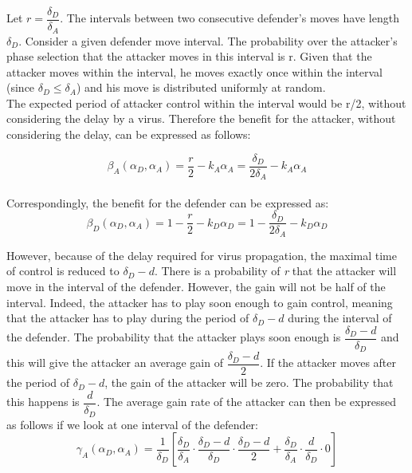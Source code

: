 \documentclass[journal,a4paper]{IEEEtran}
\begin{document}
Let $r = \dfrac{\delta_{D}}{ \delta_{A} }$. The intervals between two consecutive defender's moves have length $\delta_{D}$. Consider a given defender move interval. The probability over the attacker's phase selection that the attacker moves in this interval is r. Given that the attacker moves within the interval, he moves exactly once within the interval (since $\delta_{D} \leq \delta_{A} $) and his move is distributed uniformly at random. \\

The expected period of attacker control within the interval would be r/2, without considering the delay by a virus. Therefore the benefit for the attacker, without considering the delay, can be expressed as follows:

\begin{equation}\label{first}
\beta_{A}(\alpha_{D},\alpha_{A}) =\dfrac {r} {2} - k_{A} \alpha_{A} = \dfrac {\delta_{D}} {2\delta_{A}} - k_{A} \alpha_{A}  
\end{equation}\\

Correspondingly, the benefit for the defender can be expressed as:
\begin{equation}\label{first}
\beta_{D}(\alpha_{D},\alpha_{A}) =1 -  \dfrac {r} {2} - k_{D} \alpha_{D} = 1 - \dfrac {\delta_{D}} {2\delta_{A}} - k_{D} \alpha_{D} 
\end{equation}

However, because of the delay required for virus propagation, the maximal time of control is reduced to $\delta_{D}-d$. There is a probability of \textit{r} that the attacker will move in the interval of the defender. However, the gain will not be half of the interval. Indeed, the attacker has to play soon enough to gain control, meaning that the attacker has to play during the period of $\delta_{D}-d$ during the interval of the defender. The probability that the attacker plays soon enough is $\dfrac{\delta_{D}-d}{\delta_{D}}$ and this will give the attacker an average gain of $\dfrac{\delta_{D}-d}{2}$. If the attacker moves after the period of $\delta_{D}-d$, the gain of the attacker will be zero. The probability that this happens is  $\dfrac{d}{\delta_{D}}$. The average gain rate of the attacker can then be expressed as follows if we look at one interval of the defender:
\begin{equation}\label{first}
\gamma_{A}(\alpha_{D},\alpha_{A}) = \dfrac {1}{\delta_{D}} [ \dfrac{\delta_{D}}{\delta_{A}} \cdot \dfrac{\delta_{D}-d}{\delta_{D}} \cdot \dfrac{\delta_{D}-d}{2} + \dfrac{\delta_{D}}{\delta_{A}} \cdot \dfrac{d}{\delta_{D}} \cdot 0 ]
\end{equation}
\end{document}
